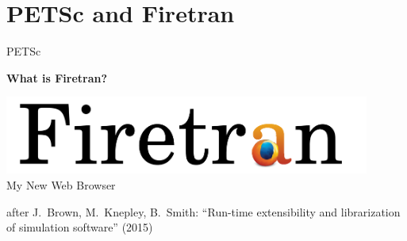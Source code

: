



%
%
\section{PETSc and Firetran}

\begin{frame}{PETSc}
   \begin{center} \Large \textbf{What is Firetran?} \end{center}
\vspace*{1cm}
\begin{center}
 \includegraphics[width=0.9\textwidth]{figures/firetran} \\
 My New Web Browser
\end{center}
\vspace*{1cm}

{ \scriptsize
after J.~Brown, M.~Knepley, B.~Smith: ``Run-time extensibility and librarization of simulation software'' (2015)
}

\end{frame}





%
%
